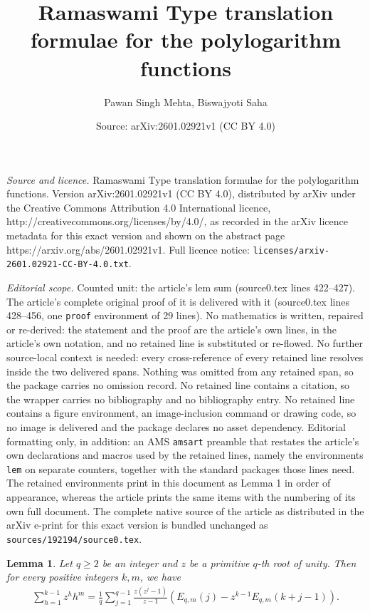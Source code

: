 \documentclass[10pt,a4paper]{amsart}
\title{Ramaswami Type translation formulae for the polylogarithm functions}
\author{Pawan Singh Mehta, Biswajyoti Saha}
\date{Source: arXiv:2601.02921v1 (CC BY 4.0)}
\newtheorem{lem}{Lemma}
\begin{document}
\maketitle

\noindent\emph{Source and licence.} Ramaswami Type translation formulae for the polylogarithm functions. Version arXiv:2601.02921v1 (CC BY 4.0), distributed by arXiv under the Creative Commons Attribution 4.0 International licence, http://creativecommons.org/licenses/by/4.0/, as recorded in the arXiv licence metadata for this exact version and shown on the abstract page https://arxiv.org/abs/2601.02921v1. Full licence notice: \texttt{licenses/arxiv-2601.02921-CC-BY-4.0.txt}.\par\smallskip

\noindent\textit{Editorial scope.} Counted unit: the article's lem sum (source0.tex lines 422--427). The article's complete original proof of it is delivered with it (source0.tex lines 428--456, one \texttt{proof} environment of 29 lines). No mathematics is written, repaired or re-derived: the statement and the proof are the article's own lines, in the article's own notation, and no retained line is substituted or re-flowed.  No further source-local context is needed: every cross-reference of every retained line resolves inside the two delivered spans.  Nothing was omitted from any retained span, so the package carries no omission record.  No retained line contains a citation, so the wrapper carries no bibliography and no bibliography entry.  No retained line contains a figure environment, an image-inclusion command or drawing code, so no image is delivered and the package declares no asset dependency.  Editorial formatting only, in addition: an AMS \texttt{amsart} preamble that restates the article's own declarations and macros used by the retained lines, namely the environments \texttt{lem} on separate counters, together with the standard packages those lines need.  The retained environments print in this document as Lemma 1 in order of appearance, whereas the article prints the same items with the numbering of its own full document.  The complete native source of the article as distributed in the arXiv e-print for this exact version is bundled unchanged as \texttt{sources/192194/source0.tex}.
 \begin{lem}\label{sum}
Let $q\geq2$ be an integer and $z$ be a primitive $q$-th root of unity. Then for every positive integers $k,m$, we have
\begin{align}\label{m-power-sum-z}
\sum_{h=1}^{k-1}z^{h}h^m =\frac{1}{q}\sum_{j=1}^{q-1} \frac{z(z^{j}-1)}{z-1}\left(E_{q,m}(j)-z^{k-1}E_{q,m}(k+j-1)\right).
\end{align}
\end{lem}
\end{document}
